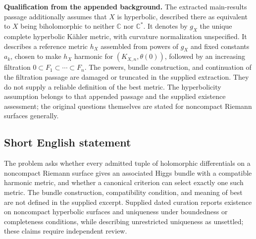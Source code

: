 \documentclass[11pt]{article}
\newcommand{\C}{\mathbb{C}}
\begin{document}
\textbf{Qualification from the appended background.} The extracted main-results passage additionally assumes that \(X\) is hyperbolic, described there as equivalent to \(X\) being biholomorphic to neither \(\C\) nor \(\C^*\). It denotes by \(g_X\) the unique complete hyperbolic K\"ahler metric, with curvature normalization unspecified. It describes a reference metric \(h_X\) assembled from powers of \(g_X\) and fixed constants \(a_k\), chosen to make \(h_X\) harmonic for \((K_{X,n},\theta(0))\), followed by an increasing filtration \(0\subset F_1\subset\cdots\subset F_n\). The powers, bundle construction, and continuation of the filtration passage are damaged or truncated in the supplied extraction. They do not supply a reliable definition of the best metric. The hyperbolicity assumption belongs to that appended passage and the supplied existence assessment; the original questions themselves are stated for noncompact Riemann surfaces generally.
\subsection{Short English statement}
The problem asks whether every admitted tuple of holomorphic differentials on a noncompact Riemann surface gives an associated Higgs bundle with a compatible harmonic metric, and whether a canonical criterion can select exactly one such metric. The bundle construction, compatibility condition, and meaning of best are not defined in the supplied excerpt. Supplied dated curation reports existence on noncompact hyperbolic surfaces and uniqueness under boundedness or completeness conditions, while describing unrestricted uniqueness as unsettled; these claims require independent review.
\end{document}
